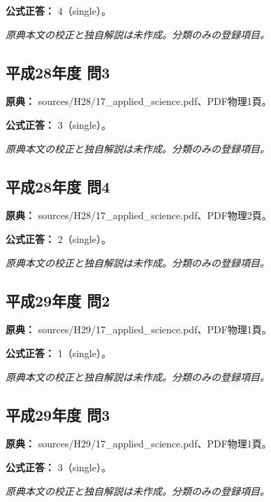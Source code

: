 \textbf{公式正答：} 4（single）。

\par\textit{原典本文の校正と独自解説は未作成。分類のみの登録項目。}

\subsection{平成28年度 問3}
\label{q:h28-reg-applied-03}

\noindent\textbf{原典：} sources/H28/17\_applied\_science.pdf、PDF物理1頁。

\textbf{公式正答：} 3（single）。

\par\textit{原典本文の校正と独自解説は未作成。分類のみの登録項目。}

\subsection{平成28年度 問4}
\label{q:h28-reg-applied-04}

\noindent\textbf{原典：} sources/H28/17\_applied\_science.pdf、PDF物理2頁。

\textbf{公式正答：} 2（single）。

\par\textit{原典本文の校正と独自解説は未作成。分類のみの登録項目。}

\subsection{平成29年度 問2}
\label{q:h29-reg-applied-02}

\noindent\textbf{原典：} sources/H29/17\_applied\_science.pdf、PDF物理1頁。

\textbf{公式正答：} 1（single）。

\par\textit{原典本文の校正と独自解説は未作成。分類のみの登録項目。}

\subsection{平成29年度 問3}
\label{q:h29-reg-applied-03}

\noindent\textbf{原典：} sources/H29/17\_applied\_science.pdf、PDF物理1頁。

\textbf{公式正答：} 3（single）。

\par\textit{原典本文の校正と独自解説は未作成。分類のみの登録項目。}

